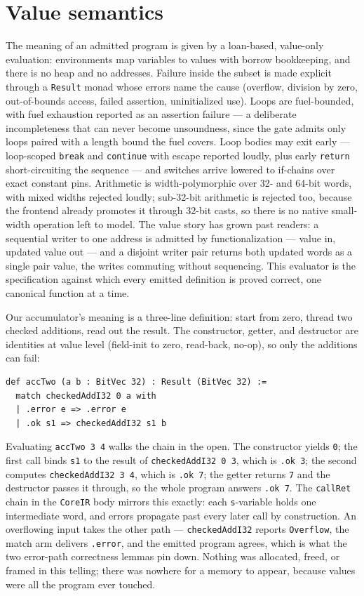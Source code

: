 \section{Value semantics}

The meaning of an admitted program is given by a loan-based, value-only
evaluation: environments map variables to values with borrow bookkeeping,
and there is no heap and no addresses. Failure inside the subset is made
explicit through a \texttt{Result} monad whose errors name the cause
(overflow, division by zero, out-of-bounds access, failed assertion,
uninitialized use). Loops are fuel-bounded, with fuel exhaustion reported
as an assertion failure --- a deliberate incompleteness that can never
become unsoundness, since the gate admits only loops paired with a length
bound the fuel covers. Loop bodies may exit early --- loop-scoped
\texttt{break} and \texttt{continue} with escape reported loudly,
plus early \texttt{return} short-circuiting the sequence ---
and switches arrive lowered to if-chains over exact constant pins.
Arithmetic is width-polymorphic over 32- and 64-bit words, with mixed
widths rejected loudly; sub-32-bit arithmetic is rejected too, because
the frontend already promotes it through 32-bit casts, so there is no
native small-width operation left to model. The value story has grown
past readers: a sequential writer to one address is admitted by
functionalization --- value in, updated value out --- and a disjoint
writer pair returns both updated words as a single pair value, the
writes commuting without sequencing. This evaluator is the
specification against which every emitted definition is proved correct,
one canonical function at a time.

Our accumulator's meaning is a three-line definition: start from zero,
thread two checked additions, read out the result. The constructor,
getter, and destructor are identities at value level (field-init to
zero, read-back, no-op), so only the additions can fail:

\begin{verbatim}
def accTwo (a b : BitVec 32) : Result (BitVec 32) :=
  match checkedAddI32 0 a with
  | .error e => .error e
  | .ok s1 => checkedAddI32 s1 b
\end{verbatim}

Evaluating \texttt{accTwo 3 4} walks the chain in the open. The
constructor yields \texttt{0}; the first call binds \texttt{s1} to the
result of \texttt{checkedAddI32 0 3}, which is \texttt{.ok 3}; the
second computes \texttt{checkedAddI32 3 4}, which is \texttt{.ok 7};
the getter returns \texttt{7} and the destructor passes it through, so
the whole program answers \texttt{.ok 7}. The \texttt{callRet} chain in
the \texttt{CoreIR} body mirrors this exactly: each \texttt{s}-variable
holds one intermediate word, and errors propagate past every later
call by construction. An overflowing input takes the other path ---
\texttt{checkedAddI32} reports \texttt{Overflow}, the match arm
delivers \texttt{.error}, and the emitted program agrees, which is
what the two error-path correctness lemmas pin down. Nothing was
allocated, freed, or framed in this telling; there was nowhere for a
memory to appear, because values were all the program ever touched.

